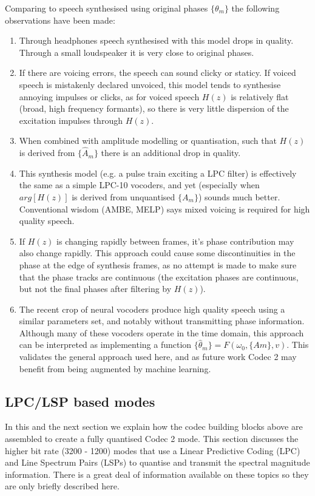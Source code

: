 \documentclass{article}
\begin{document}
{Comparing to speech synthesised using original phases $\{\theta_m\}$ the following observations have been made:
\begin{enumerate}
\item Through headphones speech synthesised with this model drops in quality. Through a small loudspeaker it is very close to original phases.
\item If there are voicing errors, the speech can sound clicky or staticy.  If voiced speech is mistakenly declared unvoiced, this model tends to synthesise annoying impulses or clicks, as for voiced speech $H(z)$ is relatively flat (broad, high frequency formants), so there is very little dispersion of the excitation impulses through $H(z)$.
\item When combined with amplitude modelling or quantisation, such that $H(z)$ is derived from $\{\hat{A}_m\}$ there is an additional drop in quality.
\item This synthesis model (e.g. a pulse train exciting a LPC filter) is effectively the same as a simple LPC-10 vocoders, and yet (especially when $arg[H(z)]$ is derived from unquantised $\{A_m\}$) sounds much better.  Conventional wisdom (AMBE, MELP) says mixed voicing is required for high quality speech.
\item If $H(z)$ is changing rapidly between frames, it's phase contribution may also change rapidly. This approach could cause some discontinuities in the phase at the edge of synthesis frames, as no attempt is made to make sure that the phase tracks are continuous (the excitation phases are continuous, but not the final phases after filtering by $H(z)$).
\item The recent crop of neural vocoders produce high quality speech using a similar parameters set, and notably without transmitting phase information.  Although many of these vocoders operate in the time domain, this approach can be interpreted as implementing a function $\{ \hat{\theta}_m\} = F(\omega_0, \{Am\},v)$.  This validates the general approach used here, and as future work Codec 2 may benefit from being augmented by machine learning.
\end{enumerate}

\subsection{LPC/LSP based modes}
\label{sect:mode_lpc_lsp}

In this and the next section we explain how the codec building blocks above are assembled to create a fully quantised Codec 2 mode.  This section discusses the higher bit rate (3200 - 1200) modes that use a Linear Predictive Coding (LPC) and Line Spectrum Pairs (LSPs) to quantise and transmit the spectral magnitude information.  There is a great deal of information available on these topics so they are only briefly described here.

}
\end{document}
